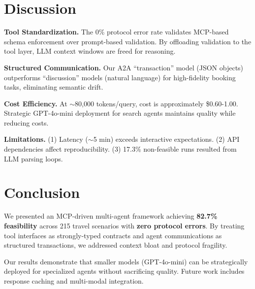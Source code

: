 \documentclass[conference]{IEEEtran}
\begin{document}
\section{Discussion}

\textbf{Tool Standardization.} The 0\% protocol error rate validates MCP-based schema enforcement over prompt-based validation. By offloading validation to the tool layer, LLM context windows are freed for reasoning.

\textbf{Structured Communication.} Our A2A ``transaction'' model (JSON objects) outperforms ``discussion'' models (natural language) for high-fidelity booking tasks, eliminating semantic drift.

\textbf{Cost Efficiency.} At $\sim$80,000 tokens/query, cost is approximately \$0.60-1.00. Strategic GPT-4o-mini deployment for search agents maintains quality while reducing costs.

\textbf{Limitations.} (1) Latency ($\sim$5 min) exceeds interactive expectations. (2) API dependencies affect reproducibility. (3) 17.3\% non-feasible runs resulted from LLM parsing loops.

\section{Conclusion}

We presented an MCP-driven multi-agent framework achieving \textbf{82.7\% feasibility} across 215 travel scenarios with \textbf{zero protocol errors}. By treating tool interfaces as strongly-typed contracts and agent communications as structured transactions, we addressed context bloat and protocol fragility.

Our results demonstrate that smaller models (GPT-4o-mini) can be strategically deployed for specialized agents without sacrificing quality. Future work includes response caching and multi-modal integration.

\balance
{\small


}
\end{document}
